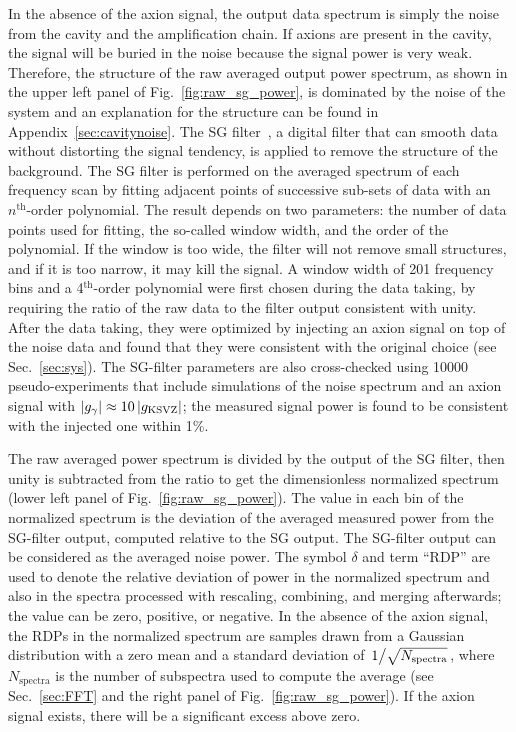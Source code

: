 In the absence of the axion signal, the output data spectrum is simply the 
noise from the cavity and the amplification chain. If axions are present 
in the cavity, the signal will be buried in the noise because the 
signal power is very weak. Therefore, the structure of the raw averaged 
output power spectrum, as shown in the upper left panel of 
Fig.~\ref{fig:raw_sg_power}, is dominated 
by the noise of the system and an explanation for the structure can be found 
in Appendix~\ref{sec:cavitynoise}. The SG 
filter~\cite{SGFilter}, a digital filter that can smooth data without 
distorting the signal tendency, is applied to remove the structure of the  
background. The SG filter is performed on the averaged spectrum of each 
frequency scan by fitting adjacent points of successive sub-sets of data with 
an $n^\text{th}$-order polynomial. The result depends on two parameters: 
the number of 
data points used for fitting, the so-called window width, and the order of 
the polynomial. If the window is too wide, the filter will not remove small 
structures, and if it is too narrow, it may kill the signal. 
A window width of 201 frequency bins and a 4$^\text{th}$-order polynomial 
were first chosen during the data taking, by 
requiring the ratio of the raw data to the filter 
output consistent with unity.  
After the data taking, they were optimized by injecting an axion signal on 
top of 
the noise data and found that they were consistent with the original choice 
(see Sec.~\ref{sec:sys}). The SG-filter parameters 
are also cross-checked using 10000 pseudo-experiments that include simulations 
of the noise spectrum and an axion signal with 
$\left|g_{\gamma}\right|\approx 10 \left|g_\text{KSVZ}\right|$; the measured signal power 
is found to be consistent with the injected one within 1\%.


The raw averaged power spectrum is divided by the output of the SG filter, 
then unity is subtracted from the ratio to get the dimensionless 
normalized spectrum (lower left panel of Fig.~\ref{fig:raw_sg_power}). The 
value in each bin of the normalized spectrum is the deviation of the 
averaged measured power from the SG-filter output, computed 
relative to the SG output. The SG-filter output can be considered 
as the averaged noise power. The symbol 
$\delta$ and term ``RDP'' are used to denote the relative deviation of power 
in the normalized spectrum and also in the spectra processed with rescaling, 
combining, and merging afterwards; the value can be zero, positive, or negative. 
In the absence of the axion signal, the RDPs in the normalized spectrum are 
samples drawn from a Gaussian 
distribution with a zero mean and a standard deviation of 
$\left.1\middle/\sqrt{N_\text{spectra}}\right.$, where $N_\text{spectra}$ is 
the number of subspectra used to compute the average (see Sec.~\ref{sec:FFT} 
and the right panel of Fig.~\ref{fig:raw_sg_power}). 
If the axion signal exists, there will be a significant excess above zero. 
 
